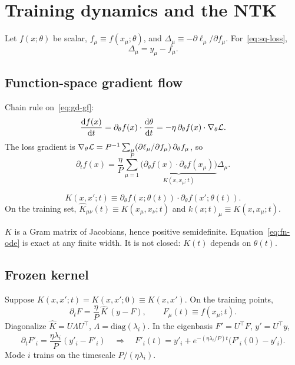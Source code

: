 \section{Training dynamics and the NTK}
\label{sec:ntk}

Let $f(x;\theta)$ be scalar, $f_\mu\equiv f(x_\mu;\theta)$, and $\Delta_\mu\equiv -\partial\ell_\mu/\partial f_\mu$. For~\eqref{eq:sq-loss},
\begin{equation}
  \Delta_\mu=y_\mu-f_\mu.
  \label{eq:delta-sq}
\end{equation}

\subsection{Function-space gradient flow}

Chain rule on~\eqref{eq:gd-gf}:
\begin{equation}
  \frac{\mathrm{d} f(x)}{\mathrm{d} t}
  =\partial_\theta f(x)\cdot\frac{\mathrm{d} \theta}{\mathrm{d} t}
  =-\eta\,\partial_\theta f(x)\cdot\nabla_\theta\mathcal{L}.
  \label{eq:chain}
\end{equation}
The loss gradient is $\nabla_\theta\mathcal{L}=P^{-1}\sum_{\mu}(\partial\ell_\mu/\partial f_\mu)\,\partial_\theta f_\mu$, so
\begin{equation}
  \partial_t f(x)
  =\frac{\eta}{P}\sum_{\mu=1}^{P}
  \underbrace{\bigl(\partial_\theta f(x)\cdot\partial_\theta f(x_\mu)\bigr)}_{K(x,x_\mu;t)}
  \Delta_\mu.
  \label{eq:fn-ode}
\end{equation}

\begin{definition}
\begin{equation}
  K(x,x';t)
  \equiv
  \partial_\theta f(x;\theta(t))\cdot\partial_\theta f(x';\theta(t)).
  \label{eq:ntk-def}
\end{equation}
On the training set, $\hat K_{\mu\nu}(t)\equiv K(x_\mu,x_\nu;t)$ and $k(x;t)_\mu\equiv K(x,x_\mu;t)$.
\end{definition}
$K$ is a Gram matrix of Jacobians, hence positive semidefinite. Equation~\eqref{eq:fn-ode} is exact at any finite width. It is not closed: $K(t)$ depends on $\theta(t)$.

\subsection{Frozen kernel}

Suppose $K(x,x';t)=K(x,x';0)\equiv K(x,x')$. On the training points,
\begin{equation}
  \partial_t F
  =\frac{\eta}{P}\,\hat K\,(y-F),
  \qquad
  F_\mu(t)\equiv f(x_\mu;t).
  \label{eq:train-ode}
\end{equation}
Diagonalize $\hat K=U\Lambda U^\top$, $\Lambda=\mathrm{diag}(\lambda_i)$. In the eigenbasis $F'=U^\top F$, $y'=U^\top y$,
\begin{equation}
  \partial_t F'_i=\frac{\eta\lambda_i}{P}(y'_i-F'_i)
  \quad\Longrightarrow\quad
  F'_i(t)=y'_i+e^{-(\eta\lambda_i/P)t}\bigl(F'_i(0)-y'_i\bigr).
  \label{eq:mode-ode}
\end{equation}
Mode $i$ trains on the timescale $P/(\eta\lambda_i)$.

